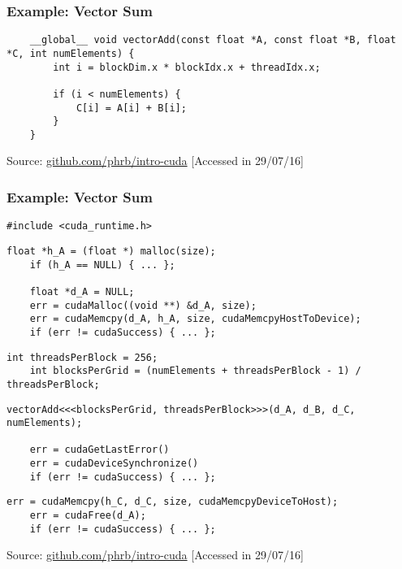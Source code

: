\documentclass[10pt, compress]{beamer}
\begin{document}
\begin{frame}[fragile]
    \frametitle{Example: Vector Sum}
    \begin{lstlisting}
    __global__ void vectorAdd(const float *A, const float *B, float *C, int numElements) {
        int i = blockDim.x * blockIdx.x + threadIdx.x;

        if (i < numElements) {
            C[i] = A[i] + B[i];
        }
    }
    \end{lstlisting}

    \vfill

    \begin{center}
        \tiny{Source: \url{github.com/phrb/intro-cuda} [Accessed in 29/07/16]}
    \end{center}
\end{frame}

\begin{frame}[fragile]
    \frametitle{Example: Vector Sum}
    \begin{lstlisting}[basicstyle=\ttfamily\scriptsize]
    #include <cuda_runtime.h>
    \end{lstlisting}

    \begin{lstlisting}[basicstyle=\ttfamily\scriptsize]
    float *h_A = (float *) malloc(size);
    if (h_A == NULL) { ... };

    float *d_A = NULL;
    err = cudaMalloc((void **) &d_A, size);
    err = cudaMemcpy(d_A, h_A, size, cudaMemcpyHostToDevice);
    if (err != cudaSuccess) { ... };
    \end{lstlisting}

    \begin{lstlisting}[basicstyle=\ttfamily\scriptsize]
    int threadsPerBlock = 256;
    int blocksPerGrid = (numElements + threadsPerBlock - 1) / threadsPerBlock;
    \end{lstlisting}

    \begin{lstlisting}[basicstyle=\ttfamily\scriptsize]
    vectorAdd<<<blocksPerGrid, threadsPerBlock>>>(d_A, d_B, d_C, numElements);

    err = cudaGetLastError()
    err = cudaDeviceSynchronize()
    if (err != cudaSuccess) { ... };
    \end{lstlisting}

    \begin{lstlisting}[basicstyle=\ttfamily\scriptsize]
    err = cudaMemcpy(h_C, d_C, size, cudaMemcpyDeviceToHost);
    err = cudaFree(d_A);
    if (err != cudaSuccess) { ... };
    \end{lstlisting}

    \vfill

    \begin{center}
        \tiny{Source: \url{github.com/phrb/intro-cuda} [Accessed in 29/07/16]}
    \end{center}
\end{frame}
\end{document}
